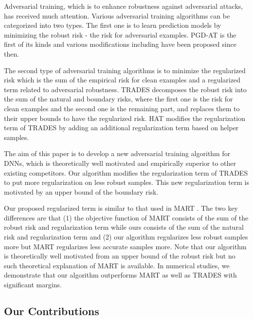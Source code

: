 \documentclass[nohyperref]{article}
\theoremstyle{plain}
\theoremstyle{definition}
\theoremstyle{remark}
\begin{document}
Adversarial training, which is to enhance robustness against adversarial attacks,
has received much attention. Various adversarial training algorithms can be 
categorized into two types.
The first one is to learn prediction models by minimizing
the robust risk - the risk for adversarial examples.
PGD-AT \citep{madry2018towards} is the first of its kinds and
various modifications including \cite{zhang2020attacks, ding2020mma, zhang2021geometry} 
have been proposed since then.

The second type of adversarial training algorithms is to minimize the regularized risk which is
the sum of the empirical risk for clean examples and a regularized term related to adversarial robustness.
TRADES \citep{zhang2019theoretically} decomposes the robust risk into the sum
of the natural and boundary risks, where the first one is the risk for clean examples
and the second one is the remaining part, and replaces them to their upper bounds to have
the regularized risk. HAT \citep{rade2022reducing} modifies the regularization term of TRADES
by adding an additional regularization term based on helper samples. 

The aim of this paper is to develop a new adversarial training algorithm for DNNs, which is theoretically well motivated and empirically superior to other existing competitors. 
Our algorithm modifies the regularization term of TRADES \citep{zhang2019theoretically} to put more regularization on less robust samples. This new regularization term is motivated
by an upper bound of the boundary risk. 

Our proposed regularized term is similar to that used in MART \citep{wang2020improving}.
The two key differences are that (1) the objective function of MART consists of the sum of the robust risk and regularization term while ours consists of the sum of the natural risk and regularization term and
(2) our algorithm regularizes less robust samples more but MART regularizes less accurate samples more.
Note that our algorithm is theoretically well motivated from an upper bound of the robust risk 
but no such theoretical explanation of MART is available. In numerical studies, we demonstrate that
our algorithm outperforms MART as well as TRADES with significant margins.

\subsection{Our Contributions}
\end{document}
